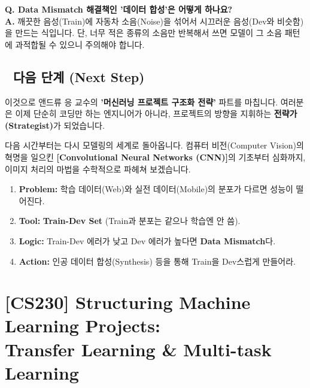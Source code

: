 \documentclass[11pt,a4paper]{book}
\theoremstyle{definition}
\begin{document}
\textbf{Q. Data Mismatch 해결책인 '데이터 합성'은 어떻게 하나요?} \\
\textbf{A.} 깨끗한 음성(Train)에 자동차 소음(Noise)을 섞어서 시끄러운 음성(Dev와 비슷함)을 만드는 식입니다. 단, 너무 적은 종류의 소음만 반복해서 쓰면 모델이 그 소음 패턴에 과적합될 수 있으니 주의해야 합니다.

\section*{🔗 다음 단계 (Next Step)}
이것으로 앤드류 응 교수의 \textbf{'머신러닝 프로젝트 구조화 전략'} 파트를 마칩니다. 여러분은 이제 단순히 코딩만 하는 엔지니어가 아니라, 프로젝트의 방향을 지휘하는 \textbf{전략가(Strategist)}가 되었습니다.

다음 시간부터는 다시 모델링의 세계로 돌아옵니다. 컴퓨터 비전(Computer Vision)의 혁명을 일으킨 \textbf{[Convolutional Neural Networks (CNN)]}의 기초부터 심화까지, 이미지 처리의 마법을 수학적으로 파헤쳐 보겠습니다.

\vspace{0.5cm}

\begin{summarybox}[title={단원 요약 (Cheat Sheet)}]
\begin{enumerate}
    \item \textbf{Problem:} 학습 데이터(Web)와 실전 데이터(Mobile)의 분포가 다르면 성능이 떨어진다.
    \item \textbf{Tool:} \textbf{Train-Dev Set} (Train과 분포는 같으나 학습엔 안 씀).
    \item \textbf{Logic:} Train-Dev 에러가 낮고 Dev 에러가 높다면 \textbf{Data Mismatch}다.
    \item \textbf{Action:} 인공 데이터 합성(Synthesis) 등을 통해 Train을 Dev스럽게 만들어라.
\end{enumerate}
\end{summarybox}


\chapter{[CS230] Structuring Machine Learning Projects: \\ Transfer Learning \& Multi-task Learning}
\label{ch:lecture27}
\end{document}
